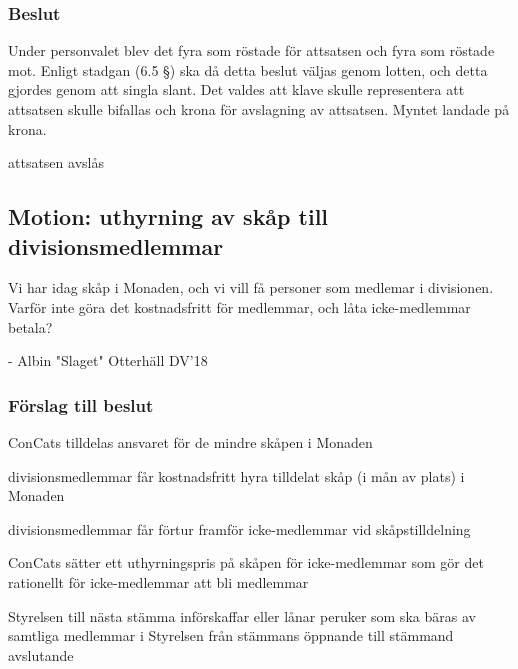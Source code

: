 \documentclass[protokoll]{dvd}
\begin{document}
\subsubsection*{Beslut}
Under personvalet blev det fyra som röstade för attsatsen och fyra som röstade mot. 
Enligt stadgan (6.5 §) ska då detta beslut väljas genom lotten, och detta gjordes genom att singla slant.
Det valdes att klave skulle representera att attsatsen skulle bifallas och krona för avslagning av attsatsen.
Myntet landade på krona.
\begin{attsatser}
    \item attsatsen avslås
\end{attsatser}

\subsection{Motion: uthyrning av skåp till divisionsmedlemmar}

Vi har idag skåp i Monaden, och vi vill få personer som medlemar i divisionen. 
Varför inte göra det kostnadsfritt för medlemmar, och låta icke-medlemmar betala?

- Albin "Slaget" Otterhäll DV'18

\subsubsection*{Förslag till beslut}
\begin{attsatser}
	\item ConCats tilldelas ansvaret för de mindre skåpen i Monaden
	\item divisionsmedlemmar får kostnadsfritt hyra tilldelat skåp (i mån av plats) i Monaden
	\item divisionsmedlemmar får förtur framför icke-medlemmar vid skåpstilldelning
	\item ConCats sätter ett uthyrningspris på skåpen för icke-medlemmar som gör det rationellt för icke-medlemmar att bli medlemmar
	\item Styrelsen till nästa stämma införskaffar eller lånar peruker som ska bäras av samtliga medlemmar i Styrelsen från stämmans öppnande till stämmand avslutande
\end{attsatser}
\end{document}
